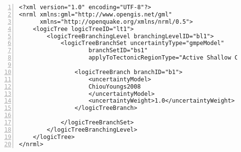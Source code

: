 \begin{Verbatim}[frame=single, commandchars=\\\{\}, fontsize=\small,
    firstnumber=1, numbers=left, numbersep=2pt]
<?xml version="1.0" encoding="UTF-8"?>
<nrml xmlns:gml="http://www.opengis.net/gml"
      xmlns="http://openquake.org/xmlns/nrml/0.5">
    <logicTree logicTreeID="lt1">
        <logicTreeBranchingLevel branchingLevelID="bl1">
            <logicTreeBranchSet uncertaintyType="gmpeModel"
                    branchSetID="bs1"
                    applyToTectonicRegionType="Active Shallow Crust">

                <logicTreeBranch branchID="b1">
                    <uncertaintyModel>
                    ChiouYoungs2008
                    </uncertaintyModel>
                    <uncertaintyWeight>1.0</uncertaintyWeight>
                </logicTreeBranch>

            </logicTreeBranchSet>
        </logicTreeBranchingLevel>
    </logicTree>
</nrml>
\end{Verbatim}
